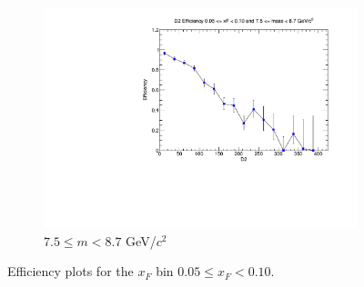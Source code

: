 \documentclass[11pt]{article}
\begin{document}
\begin{figure}[p]
\begin{subfigure}[b]{0.32\textwidth}
        \includegraphics[width=\textwidth]{./kTrackerEfficiencyPlots/D2_Efficiency_xF1_mass10.pdf}
        \caption{$7.5 \leq m < 8.7$ GeV/$c^2$}
    \end{subfigure}
    \caption{Efficiency plots for the $x_F$ bin $0.05 \leq x_F < 0.10$.}
\end{figure}
\end{document}
